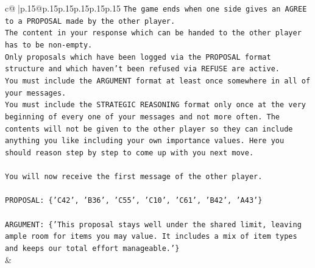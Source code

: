 \documentclass{article}
\begin{document}
{\begin{supertabular}{c@{$\;$}|p{.15\linewidth}@{}p{.15\linewidth}p{.15\linewidth}p{.15\linewidth}p{.15\linewidth}p{.15\linewidth}}
{{{\texttt{The game ends when one side gives an AGREE to a PROPOSAL made by the other player.} \\
\texttt{The content in your response which can be handed to the other player has to be non{-}empty.} \\
\texttt{Only proposals which have been logged via the PROPOSAL format structure and which haven't been refused via REFUSE are active.} \\
\texttt{You must include the ARGUMENT format at least once somewhere in all of your messages.} \\
\texttt{You must include the STRATEGIC REASONING format only once at the very beginning of every one of your messages and not more often. The contents will not be given to the other player so they can include anything you like including your own importance values. Here you should reason step by step to come up with you next move.} \\
\\ 
\texttt{You will now receive the first message of the other player.} \\
\\ 
\texttt{PROPOSAL: \{'C42', 'B36', 'C55', 'C10', 'C61', 'B42', 'A43'\}} \\
\\ 
\texttt{ARGUMENT: \{'This proposal stays well under the shared limit, leaving ample room for items you may value. It includes a mix of item types and keeps our total effort manageable.'\}} \\
            }
        }
    }
    & \\ \\


\end{supertabular}}
\end{document}
